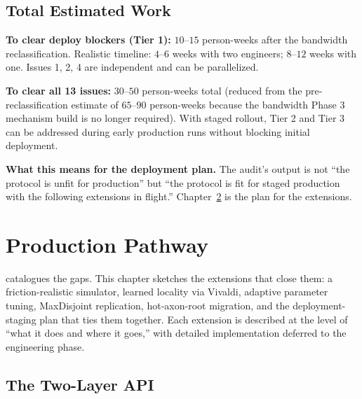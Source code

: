 \documentclass[twoside,nobib]{tufte-book}
\begin{document}
\section{Total Estimated Work}

\textbf{To clear deploy blockers (Tier 1):} $10$--$15$
person-weeks after the bandwidth reclassification. Realistic
timeline: $4$--$6$ weeks with two engineers; $8$--$12$ weeks
with one. Issues 1, 2, 4 are independent and can be parallelized.

\textbf{To clear all 13 issues:} $30$--$50$ person-weeks total
(reduced from the pre-reclassification estimate of $65$--$90$
person-weeks because the bandwidth Phase 3 mechanism build is no
longer required). With staged rollout, Tier 2 and Tier 3 can be
addressed during early production runs without blocking initial
deployment.

\textbf{What this means for the deployment plan.} The audit's
output is not ``the protocol is unfit for production'' but
``the protocol is fit for staged production with the following
extensions in flight.'' Chapter~\ref{ch:production} is the
plan for the extensions.


\chapter{Production Pathway}
\label{ch:production}

 catalogues the gaps. This chapter
sketches the extensions that close them: a friction-realistic
simulator, learned locality via Vivaldi, adaptive parameter
tuning, MaxDisjoint replication, hot-axon-root migration, and
the deployment-staging plan that ties them together. Each
extension is described at the level of ``what it does and where
it goes,'' with detailed implementation deferred to the
engineering phase.

\section{The Two-Layer API}
\label{sec:production-two-layer-api}
\end{document}
